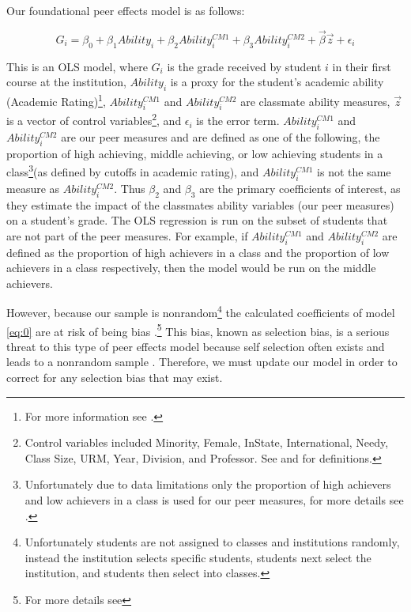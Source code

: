 Our foundational peer effects model is as follows:
\setlength{\belowdisplayskip}{6pt} \setlength{\belowdisplayshortskip}{1pt}
\setlength{\abovedisplayskip}{-4pt} \setlength{\abovedisplayshortskip}{1pt}

\begin{equation}\label{eq:0}
G_{i} = \beta_{0} + \beta_{1} Ability_{i} + \beta_{2} Ability_{i}^{CM1} + \beta_{3} Ability_{i}^{CM2} + \overrightarrow{\beta} \overrightarrow{z} + \epsilon_{i}
\end{equation}

This is an OLS model, where $G_{i}$ is the grade received by student $i$ in their first course at the institution, $Ability_{i}$ is a proxy for the student's academic ability (Academic Rating)\footnote{For more information see .}, $Ability_{i}^{CM1}$ and $Ability_{i}^{CM2}$ are classmate ability measures, $\overrightarrow{z}$ is a vector of control variables\footnote{Control variables included Minority, Female, InState, International, Needy, Class Size, URM, Year, Division, and Professor. See  and  for definitions.}, and $\epsilon_{i}$ is the error term. 
$Ability_{i}^{CM1}$ and $Ability_{i}^{CM2}$ are our peer measures and are defined as one of the following, the proportion of high achieving, middle achieving, or low achieving students in a class\footnote{Unfortunately due to data limitations only the proportion of high achievers and low achievers in a class is used for our peer measures, for more details see .}(as defined by cutoffs in academic rating), and $Ability_{i}^{CM1}$ is not the same measure as  $Ability_{i}^{CM2}$. 
Thus $\beta_{2}$ and $\beta_{3}$ are the primary coefficients of interest, as they estimate the impact of the classmates ability variables (our peer measures) on a student's grade. 
The OLS regression is run on the subset of students that are not part of the peer measures. 
For example, if $Ability_{i}^{CM1}$ and $Ability_{i}^{CM2}$ are defined as the proportion of high achievers in a class and the proportion of low achievers in a class respectively, then the model would be run on the middle achievers. 

However, because our sample is nonrandom\footnote{Unfortunately students are not assigned to classes and institutions randomly, instead the institution selects specific students, students next select the institution, and students then select into classes.} the calculated coefficients of model \eqref{eq:0} are at risk of being bias \citep{heckman1979sample}.\footnote{For more details see } This bias, known as selection bias, is a serious threat to this type of peer effects model because self selection often exists and leads to a nonrandom sample \citep{carman2012classroom,burke2013classroom,ding2007peers}. Therefore, we must update our model in order to correct for any selection bias that may exist.

